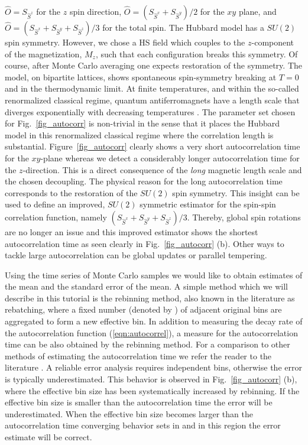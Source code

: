 \documentclass{SciPost}
\begin{document}
$\hat{O} = S_{\hat{S}^{z}}$ for the $z$ spin direction, 
$\hat{O} =(S_{\hat{S}^{x}} + S_{\hat{S}^{y}})/2$ for the $xy$ plane, and
$\hat{O} =(S_{\hat{S}^{x}} + S_{\hat{S}^{y}}+ S_{\hat{S}^{z}})/3$ for the total spin.
 The Hubbard model  has a $SU(2)$ spin symmetry. However, we chose a HS field which couples to the $z$-component of the magnetization,  $M_z$,  such that each configuration breaks this symmetry. Of course, after Monte Carlo averaging one expects restoration of the symmetry. The model, on bipartite  lattices,  shows spontaneous spin-symmetry breaking at $T=0$ and in the thermodynamic limit.  At finite temperatures, and within the so-called renormalized classical regime,  quantum antiferromagnets have a length scale  that  diverges  exponentially  with decreasing temperatures \cite{Chakravarty88}.     
The parameter set chosen for Fig.~\ref{fig_autocorr}  is non-trivial in the sense that it places the Hubbard model in this renormalized classical regime where the correlation length is substantial.  Figure~\ref{fig_autocorr}  clearly shows a very short autocorrelation time for the $xy$-plane whereas we detect a considerably longer  autocorrelation time  for the $z$-direction.  This is a direct consequence of the {\it long} magnetic length scale and the chosen decoupling.
The physical reason for the long autocorrelation time  corresponds to  the restoration of the $SU(2)$ spin symmetry.    This insight can be used to define an improved, $SU(2)$ symmetric estimator for the spin-spin correlation function, namely
$(S_{\hat{S}^{x}} + S_{\hat{S}^{y}} + S_{\hat{S}^{z}})/3$. 
 Thereby, global spin rotations are no longer an issue and this improved estimator  shows the shortest autocorrelation time as seen clearly in Fig.~\ref{fig_autocorr} (b). Other ways to tackle large autocorrelation can be global updates or parallel tempering.

Using the time series of Monte Carlo samples we would like to obtain estimates of the mean and the standard error of the mean.
A simple method which we will describe in this tutorial is the rebinning method, also known in the literature as rebatching, where a fixed number (denoted by ) of adjacent original bins are aggregated to form a new effective bin.
In addition to measuring the decay rate of the autocorrelation function (\ref{eqn:autocorrel}), a measure for the autocorrelation time  can be also obtained by the rebinning method. 
For a comparison to other methods of estimating the autocorrelation time we refer the reader to the literature \cite{Thompson2010, Geyer1992, neal1993}.
A reliable error analysis requires independent bins, otherwise the error is typically underestimated. This behavior is observed in Fig.~\ref{fig_autocorr} (b), where the effective bin size has been systematically increased by rebinning. If the effective bin size is smaller than the autocorrelation time the error will be underestimated. When the effective bin size becomes  larger than the autocorrelation time converging behavior sets in and in this region the error estimate will be correct.
\end{document}
